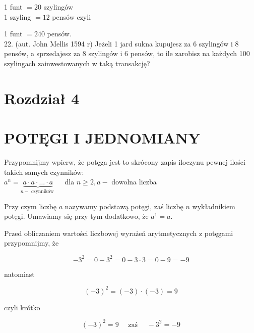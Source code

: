 \documentclass[10pt]{article}
\begin{document}
1 funt \(=20\) szylingów\\
1 szyling \(=12\) pensów czyli

1 funt \(=240\) pensów.\\
22. (aut. John Mellis 1594 r) Jeżeli 1 jard sukna kupujesz za 6 szylingów i 8 pensów, a sprzedajesz za 8 szylingów i 6 pensów, to ile zarobisz na każdych 100 szylingach zainwestowanych w taką transakcję?

\section*{Rozdział 4}
\section*{POTĘGI I JEDNOMIANY}
Przypomnijmy wpierw, że potęga jest to skrócony zapis iloczynu pewnej ilości takich samych czynników:\\
\(a^{n}=\underbrace{a \cdot a \cdot \ldots \cdot a}_{n-\text { czynników }} \quad\) dla \(n \geqslant 2, a-\) dowolna liczba

Przy czym liczbę \(a\) nazywamy podstawą potęgi, zaś liczbę \(n\) wykładnikiem potęgi. Umawiamy się przy tym dodatkowo, że \(a^{1}=a\).

Przed obliczaniem wartości liczbowej wyrażeń arytmetycznych z potęgami przypomnijmy, że

\[
-3^{2}=0-3^{2}=0-3 \cdot 3=0-9=-9
\]

natomiast

\[
(-3)^{2}=(-3) \cdot(-3)=9
\]

czyli krótko

\[
(-3)^{2}=9 \quad \text { zaś } \quad-3^{2}=-9
\]
\end{document}

